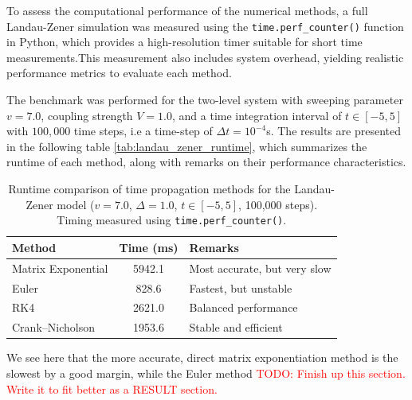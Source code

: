 \documentclass{subfiles}
\begin{document}
To assess the computational performance of the numerical methods, a full Landau-Zener simulation was measured using the \texttt{time.perf\_counter()} function in Python, which provides a high-resolution timer suitable for short time measurements.This measurement also includes system overhead, yielding realistic performance metrics to evaluate each method. 

The benchmark was performed for the two-level system with sweeping parameter $v=7.0$, coupling strength $V=1.0$, and a time integration interval of $t \in [-5, 5]$ with $100{,}000$ time steps, i.e a time-step of $\Delta t = 10^{-4}$s. The results are presented in the following table \eqref{tab:landau_zener_runtime}, which summarizes the runtime of each method, along with remarks on their performance characteristics.

\begin{table}[h!]
\centering
\caption{Runtime comparison of time propagation methods for the Landau-Zener model ($v = 7.0$, $\Delta = 1.0$, $t \in [-5, 5]$, 100,000 steps). Timing measured using \texttt{time.perf\_counter()}.}
\begin{tabular}{l c l}
\toprule
\textbf{Method} & \textbf{Time (ms)} & \textbf{Remarks} \\
\midrule
Matrix Exponential & 5942.1 & Most accurate, but very slow \\
Euler              & 828.6  & Fastest, but unstable \\
RK4                & 2621.0 & Balanced performance \\
Crank--Nicholson   & 1953.6 & Stable and efficient \\
\bottomrule
\end{tabular}\label{tab:landau_zener_runtime}
\end{table}
We see here that the more accurate, direct matrix exponentiation method is the slowest by a good margin, while the Euler method \textcolor{red}{TODO: Finish up this section. Write it to fit better as a RESULT section.}
\end{document}
